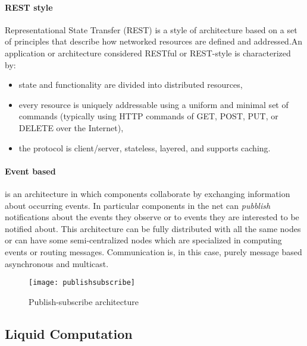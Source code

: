 \paragraph{REST style} Representational State Transfer (REST) is a style of architecture based on a set of principles that describe how networked resources are defined and addressed.An application or architecture considered RESTful or REST-style is characterized by:
\begin{itemize}
	\item state and functionality are divided into distributed resources,
	\item every resource is uniquely addressable using a uniform and minimal set of commands (typically using HTTP commands of GET, POST, PUT, or DELETE over the Internet),
	\item the protocol is client/server, stateless, layered, and supports caching.
\end{itemize}



\paragraph{Event based} is an architecture in which components collaborate by exchanging information about occurring events. In particular components in the net can \textit{pubblish} notifications about the events they observe or  to events they are interested to be notified about. This architecture can be fully distributed with all the same nodes or can have some semi-centralized nodes which are specialized in computing events or routing messages. Communication is, in this case, purely message based asynchronous and multicast. 
\begin{figure}[h]
	\centering
	\texttt{[image: publishsubscribe]}
	\caption{Publish-subscribe architecture}
	\label{fig:2.12}
\end{figure} 

\subsection{Liquid Computation}
\par 





%
